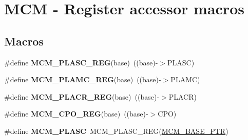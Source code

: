 \hypertarget{group___m_c_m___register___accessor___macros}{}\section{M\+CM -\/ Register accessor macros}
\label{group___m_c_m___register___accessor___macros}
\subsection*{Macros}
\begin{DoxyCompactItemize}
\item 
\mbox{\label{group___m_c_m___register___accessor___macros_ga5f5057d86df1e237371d76a2b99689ce}} 
\#define {\bfseries M\+C\+M\+\_\+\+P\+L\+A\+S\+C\+\_\+\+R\+EG}(base)~((base)-\/$>$P\+L\+A\+SC)
\item 
\mbox{\label{group___m_c_m___register___accessor___macros_ga79ed4435da37b341c75f7372eb4f33f7}} 
\#define {\bfseries M\+C\+M\+\_\+\+P\+L\+A\+M\+C\+\_\+\+R\+EG}(base)~((base)-\/$>$P\+L\+A\+MC)
\item 
\mbox{\label{group___m_c_m___register___accessor___macros_ga7352403c798ebab30d2179fa9130011a}} 
\#define {\bfseries M\+C\+M\+\_\+\+P\+L\+A\+C\+R\+\_\+\+R\+EG}(base)~((base)-\/$>$P\+L\+A\+CR)
\item 
\mbox{\label{group___m_c_m___register___accessor___macros_ga1f78c796fdf559bbbe78af4f5c1f0de3}} 
\#define {\bfseries M\+C\+M\+\_\+\+C\+P\+O\+\_\+\+R\+EG}(base)~((base)-\/$>$C\+PO)
\item 
\mbox{\label{group___m_c_m___register___accessor___macros_ga1741cb7cdef46052c2ac9e7d28fb2b53}} 
\#define {\bfseries M\+C\+M\+\_\+\+P\+L\+A\+SC}~M\+C\+M\+\_\+\+P\+L\+A\+S\+C\+\_\+\+R\+EG(\hyperlink{group___m_c_m___peripheral_gad41e931f176c230831e3dbad45117841}{M\+C\+M\+\_\+\+B\+A\+S\+E\+\_\+\+P\+TR})
\item 
\mbox{\label{group___m_c_m___register___accessor___macros_ga63f36c9c5700eb5fca4fe3852e1d6dfd}} 

\end{DoxyCompactItemize}
